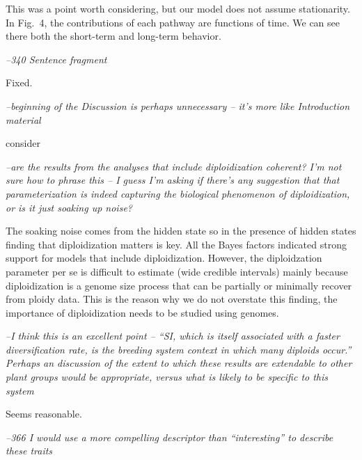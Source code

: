 \documentclass[11pt]{article}
\renewenvironment{quote}{\bigskip\noindent\itshape\ignorespaces}{\smallskip}
\begin{document}
This was a point worth considering, but our model does not assume stationarity.
In Fig.~4, the contributions of each pathway are functions of time.
We can see there both the short-term and long-term behavior.

\begin{quote}
--340  Sentence fragment
\end{quote}

Fixed. %

\begin{quote}
--beginning of the Discussion is perhaps unnecessary -- it's more like Introduction material
\end{quote}

consider %

\begin{quote}
--are the results from the analyses that include diploidization coherent?
I'm not sure how to phrase this -- I guess I'm asking if there's any suggestion that that parameterization is indeed capturing the biological phenomenon of diploidization, or is it just soaking up noise?
\end{quote}

The soaking noise comes from the hidden state so in the presence of hidden states finding that diploidization matters is key. All the Bayes factors indicated strong support for models that include diploidization. However, the diploidzation parameter per se is difficult to estimate (wide credible intervals) mainly because diploidization is a genome size process that can be partially or minimally recover from ploidy data. This is the reason why we do not overstate this finding,  the importance of diploidization needs to be studied using genomes.

\begin{quote}
--I think this is an excellent point -- ``SI, which is itself associated with a faster diversification rate, is the breeding system context in which many diploids occur.''
Perhaps an discussion of the extent to which these results are extendable to other plant groups would be appropriate, versus what is likely to be specific to this system
\end{quote}

Seems reasonable. %

\begin{quote}
--366  I would use a more compelling descriptor than ``interesting'' to describe these traits
\end{quote}
\end{document}
